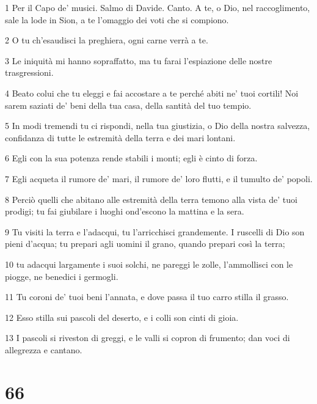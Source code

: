 \par 1 Per il Capo de' musici. Salmo di Davide. Canto. A te, o Dio, nel raccoglimento, sale la lode in Sion, a te l'omaggio dei voti che si compiono.
\par 2 O tu ch'esaudisci la preghiera, ogni carne verrà a te.
\par 3 Le iniquità mi hanno sopraffatto, ma tu farai l'espiazione delle nostre trasgressioni.
\par 4 Beato colui che tu eleggi e fai accostare a te perché abiti ne' tuoi cortili! Noi sarem saziati de' beni della tua casa, della santità del tuo tempio.
\par 5 In modi tremendi tu ci rispondi, nella tua giustizia, o Dio della nostra salvezza, confidanza di tutte le estremità della terra e dei mari lontani.
\par 6 Egli con la sua potenza rende stabili i monti; egli è cinto di forza.
\par 7 Egli acqueta il rumore de' mari, il rumore de' loro flutti, e il tumulto de' popoli.
\par 8 Perciò quelli che abitano alle estremità della terra temono alla vista de' tuoi prodigi; tu fai giubilare i luoghi ond'escono la mattina e la sera.
\par 9 Tu visiti la terra e l'adacqui, tu l'arricchisci grandemente. I ruscelli di Dio son pieni d'acqua; tu prepari agli uomini il grano, quando prepari così la terra;
\par 10 tu adacqui largamente i suoi solchi, ne pareggi le zolle, l'ammollisci con le piogge, ne benedici i germogli.
\par 11 Tu coroni de' tuoi beni l'annata, e dove passa il tuo carro stilla il grasso.
\par 12 Esso stilla sui pascoli del deserto, e i colli son cinti di gioia.
\par 13 I pascoli si riveston di greggi, e le valli si copron di frumento; dan voci di allegrezza e cantano.

\chapter{66}

